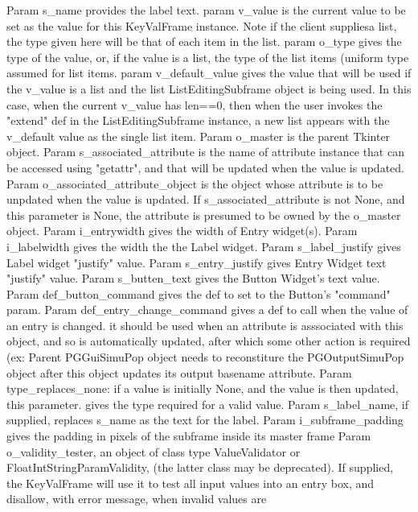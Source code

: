 \begin{DoxyVerb}Param s_name provides the label text.
param v_value is the current value to be set as the
value for this KeyValFrame instance.  Note
if the client suppliesa list, the type given
here will be that of each item in the list.
param o_type gives the type of the value, or, if
the value is a list, the type of the list items
(uniform type assumed for list items.
param v_default_value gives the value that will be used
if the v_value is a list and the list ListEditingSubframe
object is being used.  In this case, when the current v_value
has len==0, then when the user invokes the "extend" def
in the ListEditingSubframe instance, a new list appears with
the v_default value as the single list item.
Param o_master is the parent Tkinter object.
Param s_associated_attribute is the name of 
    attribute instance that can be accessed
    using "getattr", and that will be
    updated when the value is updated.
Param o_associated_attribute_object is the object whose attribute
    is to be unpdated when the value is updated.  If
    s_associated_attribute is not None, and this parameter
    is None, the attribute is presumed to be
    owned by the o_master object.
Param i_entrywidth gives the width of Entry widget(s).
Param i_labelwidth gives the width the the Label widget.
Param s_label_justify gives Label widget "justify" value.
Param s_entry_justify gives Entry Widget text "justify" value.
Param s_butten_text gives the Button Widget's text value.
Param def_button_command gives the def to set to the Button's "command" param.
Param def_entry_change_command gives a def to call when the value of an entry is changed.             
      it should be used when an attribute is asssociated with this object,
      and so is automatically updated, after which some other action is required 
      (ex: Parent PGGuiSimuPop object needs to reconstiture the PGOutputSimuPop object 
      after this object updates its output basename attribute.
Param type_replaces_none: if a value is initially None, and the value is then updated, 
      this parameter.
      gives the type required for a valid value.
Param s_label_name, if supplied, replaces s_name as the text for the label.
Param i_subframe_padding gives the padding in pixels of the subframe inside its master frame
Param o_validity_tester, an object of class type ValueValidator or FloatIntStringParamValidity,
      (the latter class may be deprecated). If supplied, the KeyValFrame will use it to test all
      input values into an entry box, and disallow, with error message, when invalid values are

\end{DoxyVerb}
